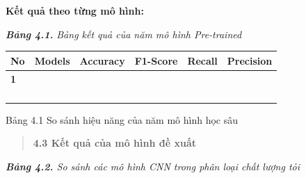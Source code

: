 \documentclass[
]{article}
\newcounter{none} %
\begin{document}
\textbf{Kết quả theo từng mô hình:}

\emph{\textbf{Bảng 4.1.}} \emph{Bảng kết quả của năm mô hình
Pre-trained}

{\def\LTcaptype{none} %
\begin{longtable}[]{@{}
  >{\centering\arraybackslash}p{}
  >{\centering\arraybackslash}p{}
  >{\centering\arraybackslash}p{}
  >{\centering\arraybackslash}p{}
  >{\centering\arraybackslash}p{}
  >{\centering\arraybackslash}p{}@{}}
\toprule\noalign{}
\begin{minipage}[b]{\linewidth}\centering
No
\end{minipage} & \begin{minipage}[b]{\linewidth}\centering
Models
\end{minipage} & \begin{minipage}[b]{\linewidth}\centering
Accuracy
\end{minipage} & \begin{minipage}[b]{\linewidth}\centering
F1-Score
\end{minipage} & \begin{minipage}[b]{\linewidth}\centering
Recall
\end{minipage} & \begin{minipage}[b]{\linewidth}\centering
Precision
\end{minipage} \\
\midrule\noalign{}
\endhead
\bottomrule\noalign{}
\endlastfoot
\textbf{1} & & & & & \\
2 & & & & & \\
3 & & & & & \\
4 & & & & & \\
5 & & & & & \\
\end{longtable}
}

Bảng 4.1 So sánh hiệu năng của năm mô hình học sâu

\begin{quote}
\protect{}\label{_Toc232112039}{}\textbf{4.3 Kết quả của mô
hình đề xuất}
\end{quote}

\emph{\textbf{Bảng 4.2.} So sánh các mô hình CNN trong phân loại chất
lượng tỏi}
\end{document}
